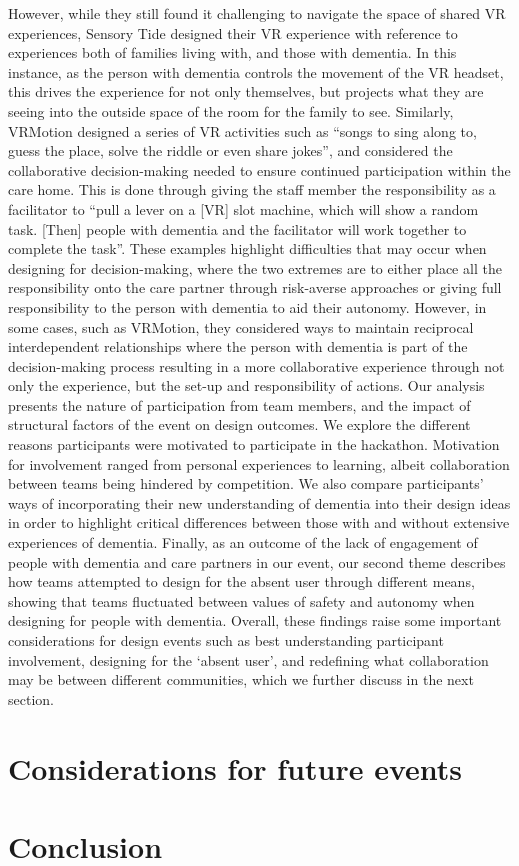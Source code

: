 However, while they still found it challenging to navigate the space of shared VR experiences, Sensory Tide designed their VR experience with reference to experiences both of families living with, and those with dementia. In this instance, as the person with dementia controls the movement of the VR headset, this drives the experience for not only themselves, but projects what they are seeing into the outside space of the room for the family to see.  Similarly, VRMotion designed a series of VR activities such as “songs to sing along to, guess the place, solve the riddle or even share jokes”, and considered the collaborative decision-making needed to ensure continued participation within the care home. This is done through giving the staff member the responsibility as a facilitator to “pull a lever on a [VR] slot machine, which will show a random task. [Then] people with dementia and the facilitator will work together to complete the task”. These examples highlight difficulties that may occur when designing for decision-making, where the two extremes are to either place all the responsibility onto the care partner through risk-averse approaches or giving full responsibility to the person with dementia to aid their autonomy. However, in some cases, such as VRMotion, they considered ways to maintain reciprocal interdependent relationships where the person with dementia is part of the decision-making process resulting in a more collaborative experience through not only the experience, but the set-up and responsibility of actions. Our analysis presents the nature of participation from team members, and the impact of structural factors of the event on design outcomes. We explore the different reasons participants were motivated to participate in the hackathon. Motivation for involvement ranged from personal experiences to learning, albeit collaboration between teams being hindered by competition. We also compare participants’ ways of incorporating their new understanding of dementia into their design ideas in order to highlight critical differences between those with and without extensive experiences of dementia. Finally, as an outcome of the lack of engagement of people with dementia and care partners in our event, our second theme describes how teams attempted to design for the absent user through different means, showing that teams fluctuated between values of safety and autonomy when designing for people with dementia. Overall, these findings raise some important considerations for design events such as best understanding participant involvement, designing for the ‘absent user’, and redefining what collaboration may be between different communities, which we further discuss in the next section. 



\section{Considerations for future events}
\label{sec:ConsdierationsEvent}

\section{Conclusion}
\label{sec:Conclusion}